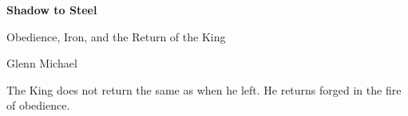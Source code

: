 \documentclass[12pt,a4paper]{book}
\begin{document}
\thispagestyle{fancy}   %

\begin{titlepage}
\begin{center}
\vspace*{3cm}   %

{\Huge \bfseries Shadow to Steel}

\vspace{0.8cm}

{\Large Obedience, Iron, and the Return of the King}

\vspace{1.2cm}

{\Large Glenn Michael}

\vspace{1.8cm}

\epigraph{The King does not return the same as when he left. 
He returns forged in the fire of obedience.}{}

\vspace{1.5cm}
\end{center}
\end{titlepage}
\end{document}
